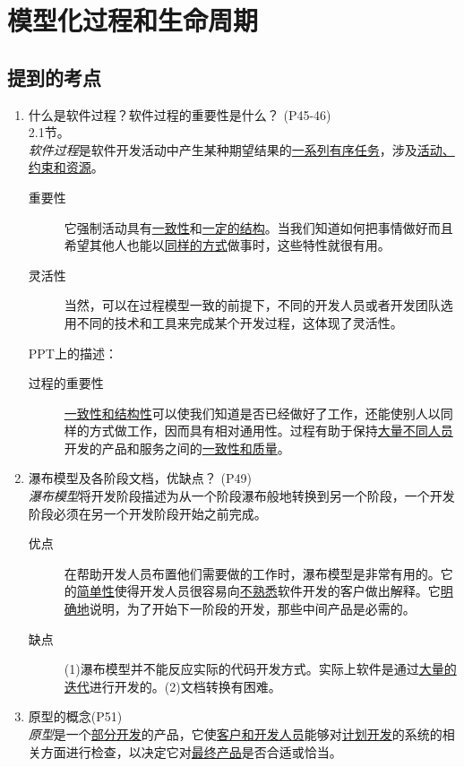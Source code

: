 \documentclass[14pt, letterpaper, UTF8, fontset=windowsnew, heading=true]{article}
\newcommand{\ul}[1]{\underline{#1}}
\begin{document}
\section{模型化过程和生命周期}

\subsection{提到的考点}

\begin{enumerate}
	\item 什么是软件过程？软件过程的重要性是什么？ (P45-46) \\
	2.1节。\\
	\emph{软件过程}是软件开发活动中产生某种期望结果的\ul{一系列有序任务}，涉及\ul{活动、约束和资源}。
	
	\begin{description}
		\item[重要性] 它强制活动具有\ul{一致性}和\ul{一定的结构}。当我们知道如何把事情做好而且希望其他人也能以\ul{同样的方式}做事时，这些特性就很有用。
		\item[灵活性] 当然，可以在过程模型一致的前提下，不同的开发人员或者开发团队选用不同的技术和工具来完成某个开发过程，这体现了灵活性。
	\end{description}

	PPT上的描述：
	\begin{description}
		\item[过程的重要性] \ul{一致性和结构性}可以使我们知道是否已经做好了工作，还能使别人以同样的方式做工作，因而具有相对通用性。过程有助于保持\ul{大量不同人员}开发的产品和服务之间的\ul{一致性和质量}。
	\end{description}	

	\item 瀑布模型及各阶段文档，优缺点？ (P49)\\
	\emph{瀑布模型}将开发阶段描述为从一个阶段瀑布般地转换到另一个阶段，一个开发阶段必须在另一个开发阶段开始之前完成。
	\begin{description}
		\item[优点] 在帮助开发人员布置他们需要做的工作时，瀑布模型是非常有用的。它的\ul{简单性}使得开发人员很容易向\ul{不熟悉}软件开发的客户做出解释。它\ul{明确地}说明，为了开始下一阶段的开发，那些中间产品是必需的。
		\item[缺点] (1)瀑布模型并不能反应实际的代码开发方式。实际上软件是通过\ul{大量的迭代}进行开发的。(2)文档转换有困难。
	\end{description}
	
	\item 原型的概念(P51) \\
	\emph{原型}是一个\ul{部分开发}的产品，它使\ul{客户和开发人员}能够对\ul{计划开发}的系统的相关方面进行检查，以决定它对\ul{最终产品}是否合适或恰当。
	

\end{enumerate}
\end{document}
